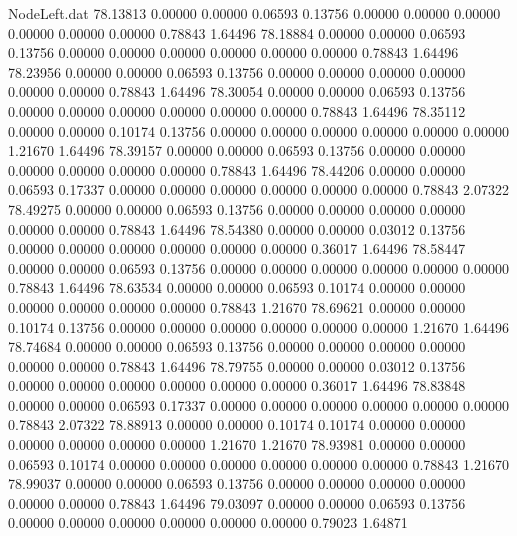 \begin{filecontents}{NodeLeft.dat}
  78.13813    0.00000    0.00000     0.06593    0.13756    0.00000    0.00000    0.00000    0.00000    0.00000    0.00000    0.78843    1.64496
  78.18884    0.00000    0.00000     0.06593    0.13756    0.00000    0.00000    0.00000    0.00000    0.00000    0.00000    0.78843    1.64496
  78.23956    0.00000    0.00000     0.06593    0.13756    0.00000    0.00000    0.00000    0.00000    0.00000    0.00000    0.78843    1.64496
  78.30054    0.00000    0.00000     0.06593    0.13756    0.00000    0.00000    0.00000    0.00000    0.00000    0.00000    0.78843    1.64496
  78.35112    0.00000    0.00000     0.10174    0.13756    0.00000    0.00000    0.00000    0.00000    0.00000    0.00000    1.21670    1.64496
  78.39157    0.00000    0.00000     0.06593    0.13756    0.00000    0.00000    0.00000    0.00000    0.00000    0.00000    0.78843    1.64496
  78.44206    0.00000    0.00000     0.06593    0.17337    0.00000    0.00000    0.00000    0.00000    0.00000    0.00000    0.78843    2.07322
  78.49275    0.00000    0.00000     0.06593    0.13756    0.00000    0.00000    0.00000    0.00000    0.00000    0.00000    0.78843    1.64496
  78.54380    0.00000    0.00000     0.03012    0.13756    0.00000    0.00000    0.00000    0.00000    0.00000    0.00000    0.36017    1.64496
  78.58447    0.00000    0.00000     0.06593    0.13756    0.00000    0.00000    0.00000    0.00000    0.00000    0.00000    0.78843    1.64496
  78.63534    0.00000    0.00000     0.06593    0.10174    0.00000    0.00000    0.00000    0.00000    0.00000    0.00000    0.78843    1.21670
  78.69621    0.00000    0.00000     0.10174    0.13756    0.00000    0.00000    0.00000    0.00000    0.00000    0.00000    1.21670    1.64496
  78.74684    0.00000    0.00000     0.06593    0.13756    0.00000    0.00000    0.00000    0.00000    0.00000    0.00000    0.78843    1.64496
  78.79755    0.00000    0.00000     0.03012    0.13756    0.00000    0.00000    0.00000    0.00000    0.00000    0.00000    0.36017    1.64496
  78.83848    0.00000    0.00000     0.06593    0.17337    0.00000    0.00000    0.00000    0.00000    0.00000    0.00000    0.78843    2.07322
  78.88913    0.00000    0.00000     0.10174    0.10174    0.00000    0.00000    0.00000    0.00000    0.00000    0.00000    1.21670    1.21670
  78.93981    0.00000    0.00000     0.06593    0.10174    0.00000    0.00000    0.00000    0.00000    0.00000    0.00000    0.78843    1.21670
  78.99037    0.00000    0.00000     0.06593    0.13756    0.00000    0.00000    0.00000    0.00000    0.00000    0.00000    0.78843    1.64496
  79.03097    0.00000    0.00000     0.06593    0.13756    0.00000    0.00000    0.00000    0.00000    0.00000    0.00000    0.79023    1.64871

\end{filecontents}
